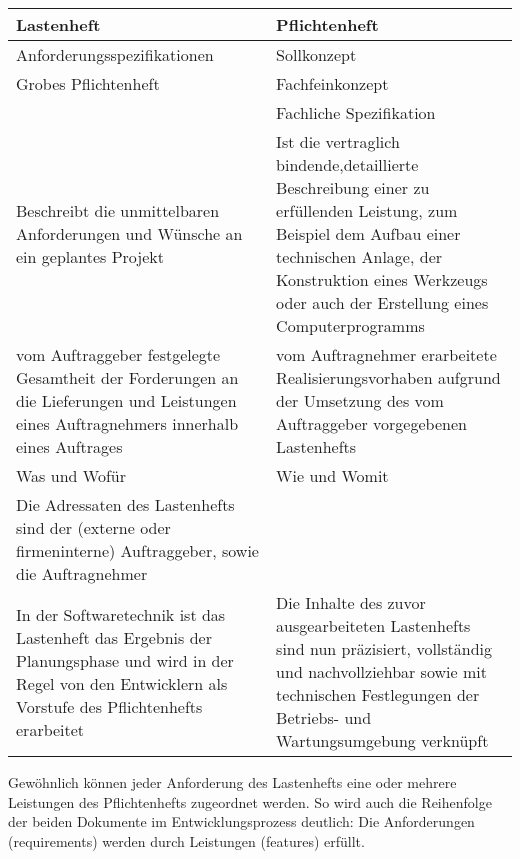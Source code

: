 \begin{tabular}{ | p{} |
p{} | }
		\hline
		{\bf Lastenheft} & {\bf Pflichtenheft}\\
		\hline
		Anforderungsspezifikationen & Sollkonzept\\
		Grobes Pflichtenheft & Fachfeinkonzept\\
		& Fachliche Spezifikation\\
		\hline
		Beschreibt die unmittelbaren Anforderungen und Wünsche an ein geplantes Projekt & Ist die vertraglich bindende,detaillierte Beschreibung einer zu erfüllenden Leistung, zum Beispiel dem Aufbau einer technischen Anlage, der Konstruktion eines Werkzeugs oder auch der Erstellung eines Computerprogramms\\
		\hline
		vom Auftraggeber festgelegte Gesamtheit der Forderungen an die Lieferungen und Leistungen eines Auftragnehmers innerhalb eines Auftrages & vom Auftragnehmer erarbeitete Realisierungsvorhaben aufgrund der Umsetzung des vom Auftraggeber vorgegebenen Lastenhefts\\
		\hline
		Was und Wofür & Wie und Womit\\
		\hline
		Die Adressaten des Lastenhefts sind der (externe oder firmeninterne) Auftraggeber, sowie die Auftragnehmer &\\
		\hline
		In der Softwaretechnik ist das Lastenheft das Ergebnis der Planungsphase und wird in der Regel von den Entwicklern als Vorstufe des Pflichtenhefts erarbeitet & Die Inhalte des zuvor ausgearbeiteten Lastenhefts sind nun präzisiert, vollständig und nachvollziehbar sowie mit technischen Festlegungen der Betriebs- und Wartungsumgebung verknüpft\\
		\hline
\end{tabular}\newline

Gewöhnlich können jeder Anforderung des Lastenhefts eine oder mehrere Leistungen des Pflichtenhefts zugeordnet werden. So wird auch die Reihenfolge der beiden Dokumente im Entwicklungsprozess deutlich: Die Anforderungen (requirements) werden durch Leistungen (features) erfüllt.\newline

